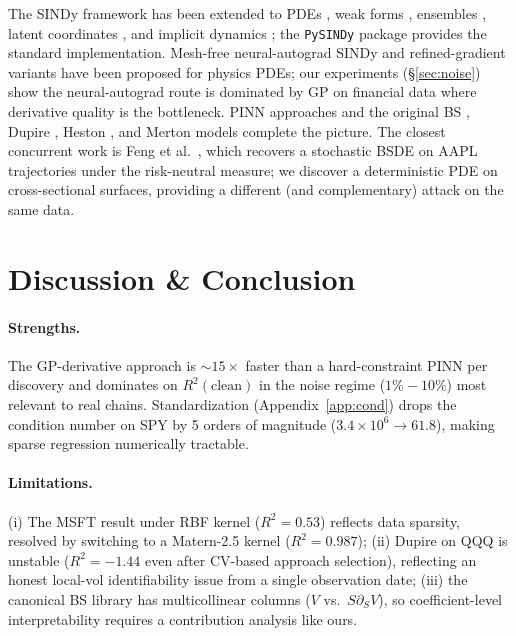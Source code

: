 \documentclass[10pt]{article}
\begin{document}
The SINDy framework \citep{brunton2016sindy,rudy2017pde} has been extended to PDEs \citep{schaeffer2017learning}, weak forms \citep{messenger2021weak}, ensembles \citep{fasel2022ensemble}, latent coordinates \citep{champion2019dataautoencoder}, and implicit dynamics \citep{kaheman2020sindypi}; the \texttt{PySINDy} package \citep{desilva2020pysindy} provides the standard implementation. Mesh-free neural-autograd SINDy \citep{gao2025meshfree} and refined-gradient variants \citep{forootani2026gnsindy} have been proposed for physics PDEs; our experiments (\S\ref{sec:noise}) show the neural-autograd route is dominated by GP on financial data where derivative quality is the bottleneck. PINN approaches \citep{raissi2019pinn,lu2021deepxde,sirignano2018dgm,dhiman2023option} and the original BS \citep{blackscholes1973}, Dupire \citep{dupire1994pricing}, Heston \citep{heston1993closed}, and Merton \citep{merton1976option} models complete the picture. The closest concurrent work is Feng et al.\ \citep{feng2025feynmankac}, which recovers a stochastic BSDE on AAPL trajectories under the risk-neutral measure; we discover a deterministic PDE on cross-sectional surfaces, providing a different (and complementary) attack on the same data.

\section{Discussion \& Conclusion}\label{sec:discuss}

\paragraph{Strengths.} The GP-derivative approach is $\sim\!15\times$ faster than a hard-constraint PINN per discovery and dominates on $R^2(\text{clean})$ in the noise regime ($1\%{-}10\%$) most relevant to real chains. Standardization (Appendix~\ref{app:cond}) drops the condition number on SPY by 5 orders of magnitude ($3.4\!\times\!10^6 \to 61.8$), making sparse regression numerically tractable.
\paragraph{Limitations.} (i) The MSFT result under RBF kernel ($R^2{=}0.53$) reflects data sparsity, resolved by switching to a Matern-2.5 kernel ($R^2{=}0.987$); (ii) Dupire on QQQ is unstable ($R^2{=}-1.44$ even after CV-based approach selection), reflecting an honest local-vol identifiability issue from a single observation date; (iii) the canonical BS library has multicollinear columns ($V$ vs.\ $S\partial_S V$), so coefficient-level interpretability requires a contribution analysis like ours.
\end{document}

